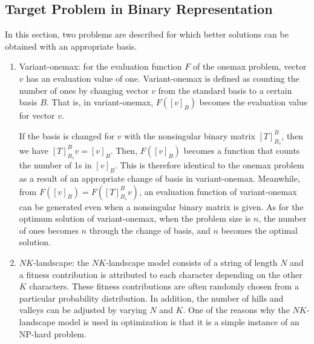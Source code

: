 \subsection{Target Problem in Binary Representation}
In this section, two problems are described for which better solutions can be obtained with an appropriate basis.
\begin{enumerate}
	\item  Variant-onemax: for the evaluation function $ F $ of the onemax problem, vector $ v $ has an evaluation value of one. Variant-onemax is defined as counting the number of ones by changing vector $ v $ from the standard basis to a certain basis $ B $. That is, in variant-onemax, $ F\left(\left[v\right]_B\right) $ becomes the evaluation value for vector $ v $.
	
	If the basis is changed for $ v $ with the nonsingular binary matrix $ \left[T\right]_{B_s}^B $, then we have $ \left[T\right]_{B_s}^Bv=\left[v\right]_B $. Then, $ F\left(\left[v\right]_B\right) $ becomes a function that counts the number of 1s in $ \left[v\right]_B $. This is therefore identical to the onemax problem as a result of an appropriate change of basis in variant-onemax. Meanwhile, from $ F\left(\left[v\right]_B\right)=F\left(\left[T\right]_{B_s}^Bv\right) $, an evaluation function of variant-onemax can be generated even when a nonsingular binary matrix is given. As for the optimum solution of variant-onemax, when the problem size is $ n $, the number of ones becomes $ n $ through the change of basis, and $ n $ becomes the optimal solution.
	
	\item $ NK $-landscape: the $ NK $-landscape model consists of a string of length $ N $ and a fitness contribution is attributed to each character depending on the other $ K $ characters. These fitness contributions are often randomly chosen from a particular probability distribution. In addition, the number of hills and valleys can be adjusted by varying $ N $ and $ K $. One of the reasons why the $ NK $-landscape model is used in optimization is that it is a simple instance of an NP-hard problem.
	
\end{enumerate}

